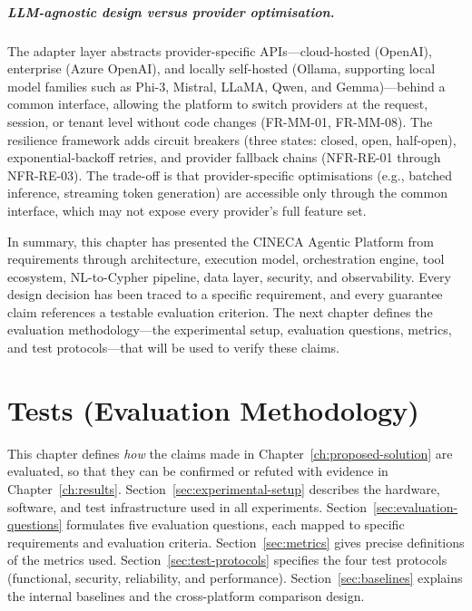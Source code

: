 \documentclass[a4paper,noexaminfo]{sapthesis}
\begin{document}
\paragraph{LLM-agnostic design versus provider optimisation.}
The adapter layer abstracts provider-specific APIs---cloud-hosted
(OpenAI), enterprise (Azure OpenAI), and locally self-hosted (Ollama,
supporting local model families such as Phi-3, Mistral, LLaMA, Qwen, and
Gemma)---behind a common interface, allowing the platform to switch
providers at the request, session, or tenant level without code changes
(FR-MM-01, FR-MM-08).  The resilience framework adds circuit breakers
(three states: closed, open, half-open), exponential-backoff retries, and
provider fallback chains (NFR-RE-01 through NFR-RE-03).  The trade-off is
that provider-specific optimisations (e.g., batched inference, streaming
token generation) are accessible only through the common interface, which
may not expose every provider's full feature set.

\medskip
\noindent
In summary, this chapter has presented the CINECA Agentic Platform from
requirements through architecture, execution model, orchestration engine,
tool ecosystem, NL-to-Cypher pipeline, data layer, security, and
observability.  Every design decision has been traced to a specific
requirement, and every guarantee claim references a testable evaluation
criterion.  The next chapter defines the evaluation methodology---the
experimental setup, evaluation questions, metrics, and test protocols---that
will be used to verify these claims.


\chapter{Tests (Evaluation Methodology)}
\label{ch:tests}

This chapter defines \emph{how} the claims made in
Chapter~\ref{ch:proposed-solution} are evaluated, so that they can be
confirmed or refuted with evidence in Chapter~\ref{ch:results}.
Section~\ref{sec:experimental-setup} describes the hardware, software, and
test infrastructure used in all experiments.
Section~\ref{sec:evaluation-questions} formulates five evaluation questions,
each mapped to specific requirements and evaluation criteria.
Section~\ref{sec:metrics} gives precise definitions of the metrics used.
Section~\ref{sec:test-protocols} specifies the four test protocols
(functional, security, reliability, and performance).
Section~\ref{sec:baselines} explains the internal baselines and the
cross-platform comparison design.
\end{document}
